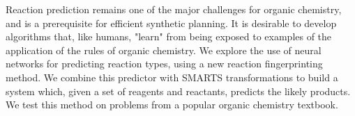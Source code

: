 Reaction prediction remains one of the major challenges for organic chemistry, and is a prerequisite for efficient synthetic planning. It is desirable to develop algorithms that, like humans, "learn" from being exposed to examples of the application of the rules of organic chemistry. We explore the use of neural networks for predicting reaction types, using a new reaction fingerprinting method.  We combine this predictor with SMARTS transformations to build a system which, given a set of reagents and reactants, predicts the likely products.  We test this method on problems from a popular organic chemistry textbook.
